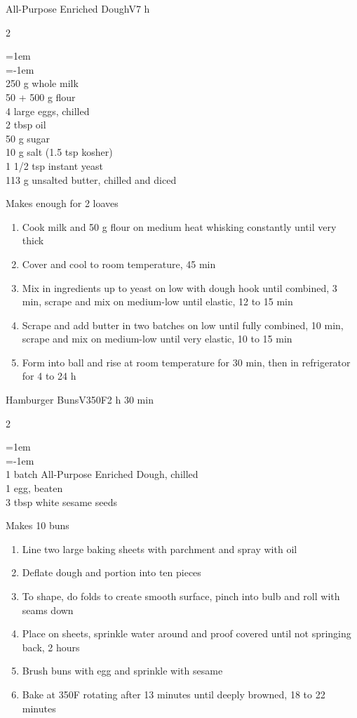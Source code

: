 \documentclass{article}
\newenvironment{recipe}[3][]
    {\begin{cardbase}[#1]{#2}{#3}
    \columnratio{0.333}
    \begin{paracol}{2}}
    {\end{paracol}\end{cardbase}}
\newenvironment{denserecipe}[3][]
    {\small
    \begin{recipe}[#1]{#2}{#3}}
    {\end{recipe}}
\newcommand{\nextcolumn}{\switchcolumn}
\newenvironment{ingredients}
    {
    \begin{obeylines}
    \vspace{\parskip}
    \setlength{\parskip}{0.25em}
    \vspace{-0.25em}
    \leftskip=1em
    \parindent=-1em}
    {\end{obeylines}}
\newenvironment{steps}
    {\begin{enumerate}[leftmargin=*,topsep=0pt]}
    {\end{enumerate}}
\newcommand{\fahrenheit}[1]{#1\textdegree{}F}
\newcommand{\tag}[1]{\hspace{1em}#1}
\newcommand{\symboltag}[2]{\tag{#1\hspace{0.4em}#2}}
\newcommand{\totaltime}[1]{\symboltag{\raisebox{-0.1em}{\small\StopWatchEnd}}{#1}}
\newcommand{\preheat}[1]{\symboltag{\Topbottomheat}{#1}}
\begin{document}
\begin{denserecipe}{All-Purpose Enriched Dough}{\tag{V}\totaltime{7 h}}
\begin{ingredients}
250 g whole milk
50 + 500 g flour
4 large eggs, chilled
2 tbsp oil
50 g sugar
10 g salt (1.5 tsp kosher)
1 1/2 tsp instant yeast
113 g unsalted butter, chilled and diced
\end{ingredients}
\nextcolumn
Makes enough for 2 loaves
\begin{steps}
    \item Cook milk and 50 g flour on medium heat whisking constantly until very thick
    \item Cover and cool to room temperature, 45 min
    \item Mix in ingredients up to yeast on low with dough hook until combined, 3 min, scrape and mix on medium-low until elastic, 12 to 15 min
    \item Scrape and add butter in two batches on low until fully combined, 10 min, scrape and mix on medium-low until very elastic, 10 to 15 min
    \item Form into ball and rise at room temperature for 30 min, then in refrigerator for 4 to 24 h
\end{steps}
\end{denserecipe}

\begin{denserecipe}{Hamburger Buns}{\tag{V}\preheat{\fahrenheit{350}}\totaltime{2 h 30 min}}
\begin{ingredients}
1 batch All-Purpose Enriched Dough, chilled
1 egg, beaten
3 tbsp white sesame seeds 
\end{ingredients}
\nextcolumn
Makes 10 buns
\begin{steps}
    \item Line two large baking sheets with parchment and spray with oil
    \item Deflate dough and portion into ten pieces
    \item To shape, do folds to create smooth surface, pinch into bulb and roll with seams down
    \item Place on sheets, sprinkle water around and proof covered until not springing back, 2 hours
    \item Brush buns with egg and sprinkle with sesame
    \item Bake at \fahrenheit{350} rotating after 13 minutes until deeply browned, 18 to 22 minutes
\end{steps}
\end{denserecipe}
\end{document}
